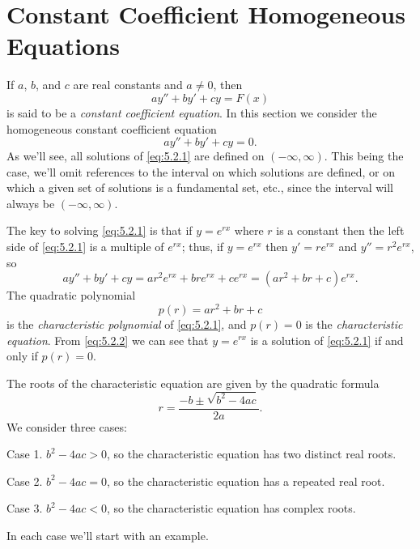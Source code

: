\section{Constant Coefficient Homogeneous Equations}

\noindent
If $a$, $b$, and $c$ are real constants and $a\ne0$, then
\[
  ay''+by'+cy=F(x)
\]
is said to be a {\color{blue}\it constant coefficient equation}. In this section we consider the
homogeneous constant coefficient equation
\begin{equation}
  \label{eq:5.2.1}ay''+by'+cy=0.
\end{equation}
As we'll see, all solutions of \eqref{eq:5.2.1} are defined on $(-\infty,\infty)$. This being the
case, we'll omit references to the interval on which solutions are defined, or on which a given set
of solutions is a fundamental set, etc., since the interval will always be $(-\infty,\infty)$.

The key to solving \eqref{eq:5.2.1} is that if $y=e^{rx}$ where $r$ is a constant then the left side
of \eqref{eq:5.2.1} is a multiple of $e^{rx}$; thus, if $y=e^{rx}$ then $y'=re^{rx}$ and
$y''=r^{2}e^{rx}$, so
\begin{equation}
  \label{eq:5.2.2}ay''+by'+cy=ar^{2}e^{rx}+bre^{rx}+ce^{rx}=(ar^{2}+br+c)e^{rx}.
\end{equation}
The quadratic polynomial
\[
  p(r)=ar^{2}+br+c
\]
is the {\color{blue}\it characteristic polynomial\/} of \eqref{eq:5.2.1}, and $p(r)=0$ is the
{\color{blue}\it characteristic equation\/}. From \eqref{eq:5.2.2} we can see that $y=e^{rx}$ is a
solution of \eqref{eq:5.2.1} if and only if $p(r)=0$.

The roots of the characteristic equation are given by the quadratic formula
\begin{equation}
  \label{eq:5.2.3}r=\frac{-b\pm\sqrt{b^{2}-4ac}}{2a}.
\end{equation}
We consider three cases:
\begin{description}
  \item {\sc Case 1.} $b^{2}-4ac>0$, so the characteristic equation has two distinct real roots.

  \item {\sc Case 2.} $b^{2}-4ac=0$, so the characteristic equation has a repeated real root.

  \item {\sc Case 3.} $b^{2}-4ac<0$, so the characteristic equation has complex roots.
\end{description}
In each case we'll start with an example.

